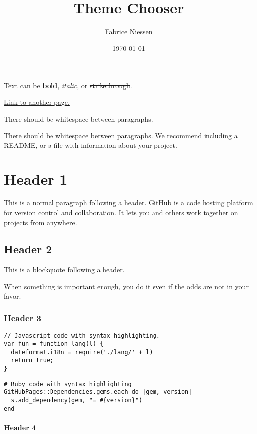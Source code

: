 \documentclass[11pt]{article}
\author{Fabrice Niessen}
\date{\today}
\title{Theme Chooser}
\begin{document}
\maketitle
\setcounter{tocdepth}{4}
\tableofcontents

Text can be \textbf{bold}, \emph{italic}, or \sout{strikethrough}.

\href{https://github.com/fniessen/org-html-themes/org/theme-chooser.htmltheme-chooser.txt}{Link to another page.}

There should be whitespace between paragraphs.

There should be whitespace between paragraphs. We recommend including a README,
or a file with information about your project.

\section*{Header 1}
\label{sec:orgbbfe3cf}

This is a normal paragraph following a header. GitHub is a code hosting platform
for version control and collaboration. It lets you and others work together on
projects from anywhere.

\subsection*{Header 2}
\label{sec:orgea4090b}

This is a blockquote following a header.

When something is important enough, you do it even if the odds are not in your
favor.

\subsubsection*{Header 3}
\label{sec:orge01969e}

\begin{verbatim}
// Javascript code with syntax highlighting.
var fun = function lang(l) {
  dateformat.i18n = require('./lang/' + l)
  return true;
}
\end{verbatim}

\begin{verbatim}
# Ruby code with syntax highlighting
GitHubPages::Dependencies.gems.each do |gem, version|
  s.add_dependency(gem, "= #{version}")
end
\end{verbatim}

\paragraph*{Header 4}
\label{sec:orgb5c9f94}
\end{document}
